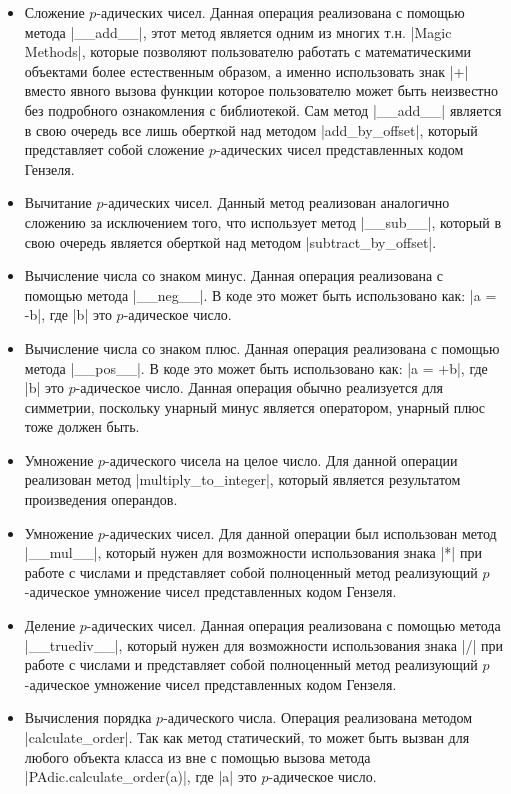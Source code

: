 \documentclass[master, och, diploma, times]{sty/SCWorks}
\theoremstyle{plain}
\theoremstyle{definition}
\begin{document}
 \begin{itemize}
 
  \item Сложение $p$-адических чисел. Данная операция реализована с помощью метода |__add__|, этот метод является одним из многих т.н. |Magic Methods|, которые позволяют пользователю работать с математическими объектами более естественным образом, а именно использовать знак |+| вместо явного вызова функции которое пользователю может быть неизвестно без подробного ознакомления с библиотекой. Сам метод |__add__| является в свою очередь все лишь оберткой над методом |add_by_offset|, который представляет собой сложение $p$-адических чисел представленных кодом Гензеля.
  \item Вычитание $p$-адических чисел. Данный метод реализован аналогично сложению за исключением того, что использует метод |__sub__|, который в свою очередь является оберткой над методом |subtract_by_offset|.
  \item Вычисление числа со знаком минус. Данная операция реализована с помощью метода |__neg__|. В коде это может быть использовано как: |a = -b|, где |b| это $p$-адическое число.
  \item Вычисление числа со знаком плюс. Данная операция реализована с помощью метода |__pos__|. В коде это может быть использовано как: |a = +b|, где |b| это $p$-адическое число. Данная операция обычно реализуется для симметрии, поскольку унарный минус является оператором, унарный плюс тоже должен быть.
  \item Умножение $p$-адического чисела на целое число. Для данной операции реализован метод |multiply_to_integer|, который является результатом произведения операндов.
  \item Умножение $p$-адических чисел. Для данной операции был использован метод |__mul__|, который нужен для возможности использования знака |*| при работе с числами и представляет собой полноценный метод реализующий $p$-адическое умножение чисел представленных кодом Гензеля.
  \item Деление $p$-адических чисел. Данная операция реализована с помощью метода |__truediv__|, который нужен для возможности использования знака |/| при работе с числами и представляет собой полноценный метод реализующий $p$-адическое умножение чисел представленных кодом Гензеля.
  \item Вычисления порядка $p$-адического числа. Операция реализована методом |calculate_order|. Так как метод статический, то может быть вызван для любого объекта класса из вне с помощью вызова метода \\ |PAdic.calculate_order(a)|, где |a| это $p$-адическое число.

\end{itemize}
\end{document}
